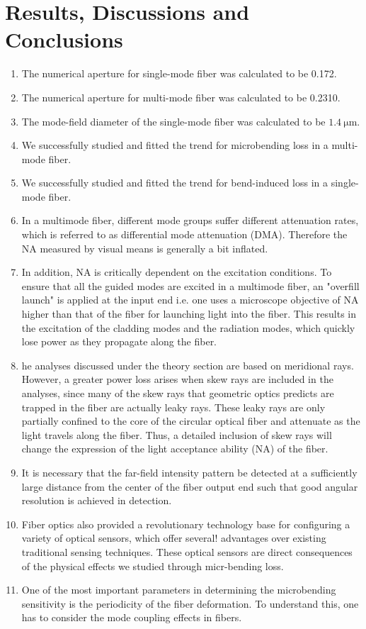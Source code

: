 \documentclass[%
 reprint,
nofootinbib,
 amsmath,amssymb,
 aps,
]{revtex4-2}
\begin{document}
\section{Results, Discussions and Conclusions} \label{sec:Disc}
\begin{enumerate}
	\item The numerical aperture for single-mode fiber was calculated to be 0.172.
	\item The numerical aperture for multi-mode fiber was calculated to be 0.2310. 
	\item The mode-field diameter of the single-mode fiber was calculated to be $ \SI{1.4}{\micro \meter} $.
	\item We successfully studied and fitted the trend for microbending loss in a multi-mode fiber.
	\item We successfully studied and fitted the trend for bend-induced loss in a single-mode fiber.
	\item In a multimode fiber, different mode groups suffer different attenuation rates, which is
	referred to as differential mode attenuation (DMA). Therefore the NA measured by visual means is generally a bit inflated.
	\item In addition, NA is
	critically dependent on the excitation conditions. To ensure that all the guided modes are
	excited in a multimode fiber, an "overfill launch" is applied at the input end i.e. one uses
	a microscope objective of NA higher than that of the fiber for launching light into the
	fiber. This results in the excitation of the cladding modes and the radiation modes, which
	quickly lose power as they propagate along the fiber.
	\item he analyses discussed under the theory section are based on meridional rays.
	However, a greater power loss arises when skew rays are included in the analyses, since
	many of the skew rays that geometric optics predicts are trapped in the fiber are actually
	leaky rays. These leaky rays are only partially confined to the core of the circular optical
	fiber and attenuate as the light travels along the fiber. Thus, a detailed inclusion of skew
	rays will change the expression of the light acceptance ability (NA) of the fiber.
	\item It is necessary that the far-field intensity pattern be detected at a sufficiently large
	distance from the center of the fiber output end such that good angular resolution is
	achieved in detection.
	\item Fiber optics also provided a revolutionary
	technology base for configuring a variety of optical sensors, which offer several!
	advantages over existing traditional sensing techniques. These optical sensors are direct consequences of the physical effects we studied through micr-bending loss.
	\item  One of the most
	important parameters in determining the microbending sensitivity is the periodicity of the
	fiber deformation. To understand this, one has to consider the mode coupling effects in
	fibers.
\end{enumerate}
	
\end{document}
